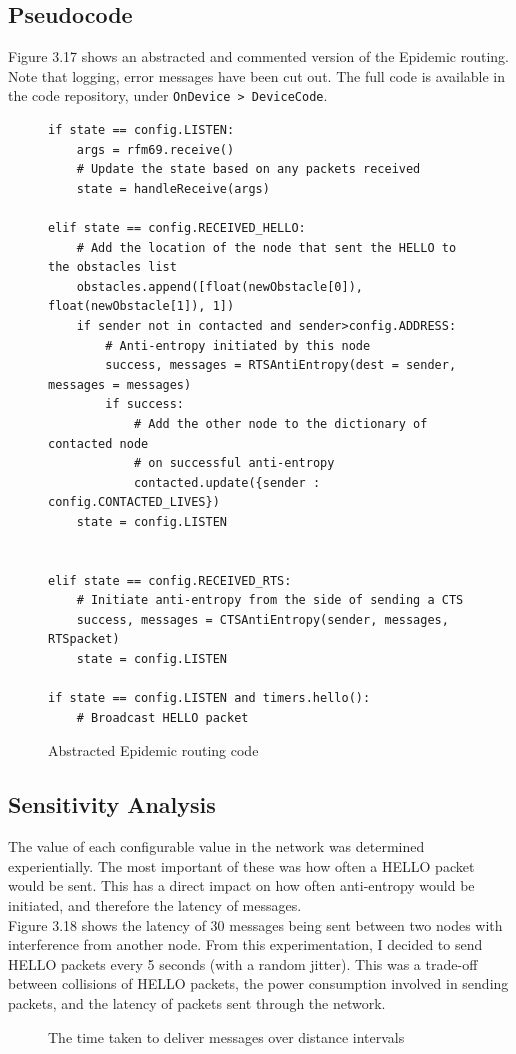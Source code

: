 \documentclass[12pt,a4paper]{report}
\begin{document}
\subsection{Pseudocode}
Figure 3.17 shows an abstracted and commented version of the Epidemic routing. Note that logging, error messages have been cut out. The full code is available in the code repository, under \verb'OnDevice > DeviceCode'.
\begin{figure}[h] 
\begin{verbatim}
if state == config.LISTEN:
    args = rfm69.receive()
    # Update the state based on any packets received
    state = handleReceive(args) 

elif state == config.RECEIVED_HELLO:
    # Add the location of the node that sent the HELLO to the obstacles list
    obstacles.append([float(newObstacle[0]), float(newObstacle[1]), 1])
    if sender not in contacted and sender>config.ADDRESS:
        # Anti-entropy initiated by this node
        success, messages = RTSAntiEntropy(dest = sender, messages = messages)
        if success:
            # Add the other node to the dictionary of contacted node 
            # on successful anti-entropy
            contacted.update({sender : config.CONTACTED_LIVES})
    state = config.LISTEN

    
elif state == config.RECEIVED_RTS:
    # Initiate anti-entropy from the side of sending a CTS       
    success, messages = CTSAntiEntropy(sender, messages, RTSpacket)
    state = config.LISTEN

if state == config.LISTEN and timers.hello():
    # Broadcast HELLO packet
\end{verbatim}
\caption{Abstracted Epidemic routing code}
\end{figure}
\FloatBarrier

\subsection{Sensitivity Analysis}
The value of each configurable value in the network was determined experientially. The most important of these was how often a HELLO packet would be sent. This has a direct impact on how often anti-entropy would be initiated, and therefore the latency of messages. \\ 
Figure 3.18 shows the latency of 30 messages being sent between two nodes with interference from another node. From this experimentation, I decided to send HELLO packets every 5 seconds (with a random jitter). This was a trade-off between collisions of HELLO packets, the power consumption involved in sending packets, and the latency of packets sent through the network.
\begin{figure}[h]
\begin{center}

\end{center}
\caption{The time taken to deliver messages over distance intervals}
\end{figure}
\FloatBarrier
\end{document}

